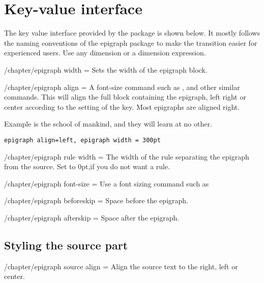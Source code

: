 \section{Key-value interface}
The key value interface provided by the package is shown below. It mostly follows the 
naming conventions of the epigraph package to make the transition easier for experienced users. Use any dimension or a dimension expression.
\medskip

\begin{key}{/chapter/epigraph width = }
  Sets the width of the epigraph block. 
\end{key}


\begin{key}{/chapter/epigraph align = }
 A font-size command such as , 
 and other similar commands. This will align the full block containing the epigraph, left right or center according to the setting of the key. Most epigraphs are aligned right.
\end{key}

\epigraph{Example is the school of mankind, and they
will learn at no other.}{\texttt{epigraph align=left, epigraph width = 300pt}}


\begin{key}{/chapter/epigraph rule width = }
 The width of the rule separating the epigraph from the source. Set to 0pt,if you do not want a rule.
\end{key}

\begin{key}{/chapter/epigraph font-size = }  Use a font sizing command such as \cmd{\footnotesize}
\end{key}

\begin{key}{/chapter/epigraph beforeskip = }
Space before the epigraph.
\end{key}

\begin{key}{/chapter/epigraph afterskip = }
Space after the epigraph.
\end{key}

\subsection{Styling the source part}

\begin{key}{/chapter/epigraph source align = }
Align the source text to the right, left or center.
\end{key}

